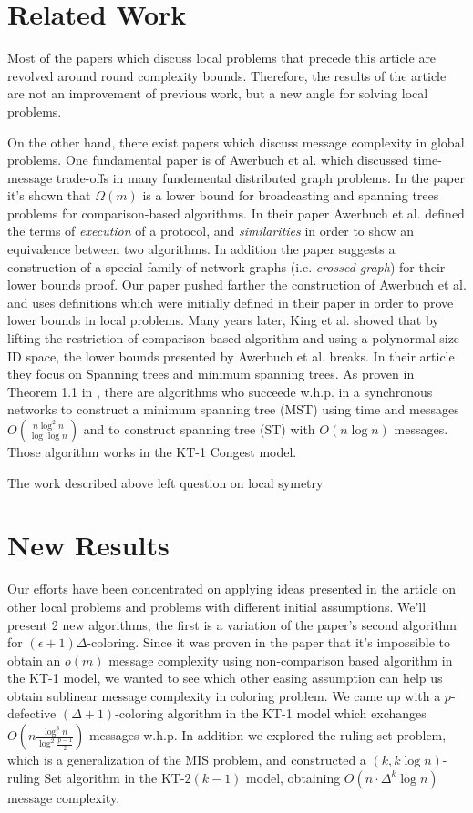 \documentclass[11pt]{article}
\begin{document}
\section{Related Work}
Most of the papers which discuss local problems that precede this article are revolved around round complexity bounds. Therefore, the results of the article are not an improvement of previous work, but a new angle for solving local problems.

On the other hand, there exist papers which discuss message complexity in global problems. One fundamental paper is of Awerbuch et al.\cite{Awerbuch} which discussed time-message trade-offs in many fundemental distributed graph problems. In the paper it's shown that $\Omega(m)$ is a lower bound for broadcasting and spanning trees problems for comparison-based algorithms. In their paper Awerbuch et al. defined the terms of \textit{execution} of a protocol, and \textit{similarities} in order to show an equivalence between two algorithms. In addition the paper suggests a construction of a special family of network graphs (i.e. \textit{crossed graph}) for their lower bounds proof. Our paper pushed farther the construction of Awerbuch et al. and uses definitions which were initially defined in their paper in order to prove lower bounds in local problems.
Many years later, King et al. \cite{King} showed that by lifting the restriction of comparison-based algorithm and using a polynormal size ID space, the lower bounds presented by Awerbuch et al. breaks. In their article they focus on Spanning trees and minimum spanning trees. As proven in Theorem 1.1 in \cite{King}, there are algorithms who succeede w.h.p. in a synchronous networks to construct a minimum spanning tree (MST) using time and messages $O(\frac{n\log^2{n}}{\log{\log{n}}})$ and to construct spanning tree (ST) with $O(n\log{n})$ messages. Those algorithm works in the KT-1 Congest model.

The work described above left question on local symetry

\section{New Results}
Our efforts have been concentrated on applying ideas presented in the article on other local problems and problems with different initial assumptions. We'll present 2 new algorithms, the first is a variation of the paper's second algorithm for $(\epsilon+1)\Delta$-coloring. Since it was proven in the paper that it's impossible to obtain an $o(m)$ message complexity using non-comparison based algorithm in the KT-1 model, we wanted to see which other easing assumption can help us obtain sublinear message complexity in coloring problem. We came up with a $p$-defective $(\Delta+1)$-coloring algorithm in the KT-1 model which exchanges $O(n \frac{\log^3{n}}{\log^2{\frac{p-1}{2}}})$ messages w.h.p.
In addition we explored the ruling set problem, which is a generalization of the MIS problem, and constructed a $(k, k\log{n})$-ruling Set algorithm in the KT-$2(k-1)$ model, obtaining $O(n\cdot\Delta^k\log{n})$ message complexity. 
\end{document}
